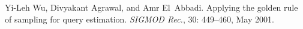 \begin{thebibliography}{67}
Yi-Leh Wu, Divyakant Agrawal, and Amr El~Abbadi.
\newblock Applying the golden rule of sampling for query estimation.
\newblock \emph{SIGMOD Rec.}, 30: 449--460, May 2001.

\end{thebibliography}
\fi

